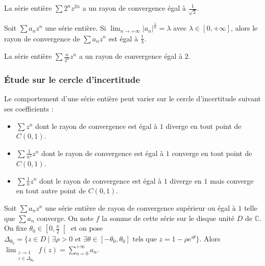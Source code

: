   \begin{example}
    La série entière $\sum 2^n z^{2n}$ a un rayon de convergence égal à $\frac{1}{\sqrt{2}}$.
  \end{example}

  \begin{corollary}
    Soit $\sum a_n z^n$ une série entière. Si $\lim_{n \rightarrow +\infty} \left| a_n \right|^{\frac{1}{n}} = \lambda$ avec $\lambda \in [0, +\infty]$, alors le rayon de convergence de $\sum a_n z^n$ est égal à $\frac{1}{\lambda}$.
  \end{corollary}

  \begin{example}
    La série entière $\sum \frac{n}{2^n} z^n$ a un rayon de convergence égal à $2$.
  \end{example}

  \subsubsection{Étude sur le cercle d'incertitude}


  \begin{example}
    Le comportement d'une série entière peut varier sur le cercle d'incertitude suivant ses coefficients :
    \begin{itemize}
      \item $\sum z^n$ dont le rayon de convergence est égal à $1$ diverge en tout point de $C(0,1)$.
      \item $\sum \frac{1}{n^2} z^n$ dont le rayon de convergence est égal à $1$ converge en tout point de $C(0,1)$.
      \item $\sum \frac{1}{n} z^n$ dont le rayon de convergence est égal à $1$ diverge en $1$ mais converge en tout autre point de $C(0,1)$.
    \end{itemize}
  \end{example}


  \begin{theorem}
    \label{243-1}
    Soit $\sum a_n z^n$ une série entière de rayon de convergence supérieur ou égal à $1$ telle que $\sum a_n$ converge. On note $f$ la somme de cette série sur le disque unité $D$ de $\mathbb{C}$. On fixe $\theta_0 \in \left[ 0, \frac{\pi}{2} \right[$ et on pose $\Delta_{\theta_0} = \{ z \in D \mid \exists \rho > 0 \text{ et } \exists \theta \in [-\theta_0, \theta_0] \text{ tels que } z = 1 - \rho e^{i\theta} \}$.
    \newpar
    Alors $\lim_{\substack{z \rightarrow 1 \\ z \in \Delta_{\theta_0}}} f(z) = \sum_{n=0}^{+\infty} a_n$.
  \end{theorem}

